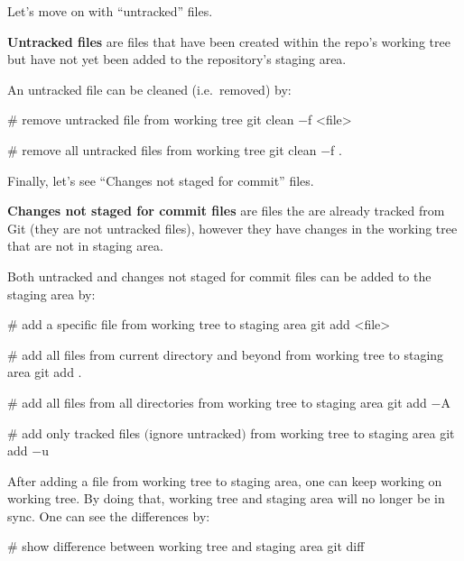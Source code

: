 Let's move on with ``untracked'' files.

\textbf{Untracked files} are files that have been created within the repo's working tree but have not yet been added
to the repository's staging area.
\ed

An untracked file can be cleaned (i.e.\ removed) by:

\begin{bash}
# remove untracked file from working tree
git clean $-$f <file>
\end{bash}

\begin{bash}
# remove all untracked files from working tree
git clean $-$f .
\end{bash}

Finally, let's see ``Changes not staged for commit'' files.

\textbf{Changes not staged for commit files} are files the are already tracked from Git (they are not untracked
files), however they have changes in the working tree that are not in staging area.
\ed

Both untracked and changes not staged for commit files can be added to the staging area by:

\begin{bash}
# add a specific file from working tree to staging area
git add <file>
\end{bash}


\begin{bash}
# add all files from current directory and beyond from working tree to staging area
git add .
\end{bash}

\begin{bash}
# add all files from all directories from working tree to staging area
git add $-$A
\end{bash}

\begin{bash}
# add only tracked files $($ignore untracked$)$ from working tree to staging area
git add $-$u
\end{bash}

After adding a file from working tree to staging area, one can keep working on working tree. By doing that, working
tree and staging area will no longer be in sync. One can see the differences by:

\begin{bash}
# show difference between working tree and staging area
git diff
\end{bash}


